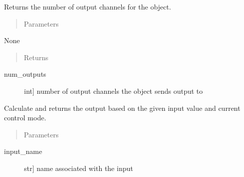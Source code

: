 \documentclass[letterpaper,10pt,english]{sphinxmanual}
\begin{document}
\begin{fulllineitems}

\begin{fulllineitems}
\label{\detokenize{specific:NeckTiltOutput.NeckTiltOutput.get_num_channels}}
\sphinxAtStartPar
Returns the number of output channels for the object.
\begin{quote}\begin{description}
\item[{Parameters}] \leavevmode
\end{description}\end{quote}

\sphinxAtStartPar
None
\begin{quote}\begin{description}
\item[{Returns}] \leavevmode
\end{description}\end{quote}
\begin{description}
\item[{num\_outputs}] \leavevmode{[}int{]}
\sphinxAtStartPar
number of output channels the object sends output to

\end{description}

\end{fulllineitems}


\begin{fulllineitems}
\label{\detokenize{specific:NeckTiltOutput.NeckTiltOutput.get_output}}
\sphinxAtStartPar
Calculate and returns the output based on the given input value and current control mode.
\begin{quote}\begin{description}
\item[{Parameters}] \leavevmode
\end{description}\end{quote}
\begin{description}
\item[{input\_name}] \leavevmode{[}str{]}
\sphinxAtStartPar
name associated with the input


\end{description}
\end{fulllineitems}
\end{fulllineitems}
\end{document}
